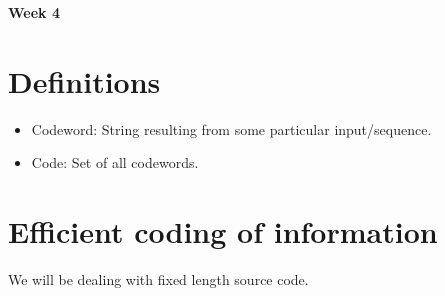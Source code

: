 \documentclass{article}
\begin{document}
\begin{center}
\textbf{\huge{Week 4}}
\end{center}

\section{Definitions}
\begin{itemize}
    \item Codeword: String resulting from some particular input/sequence.
    \item Code: Set of all codewords.
\end{itemize}

\section{Efficient coding of information}

We will be dealing with fixed length source code.
\end{document}
